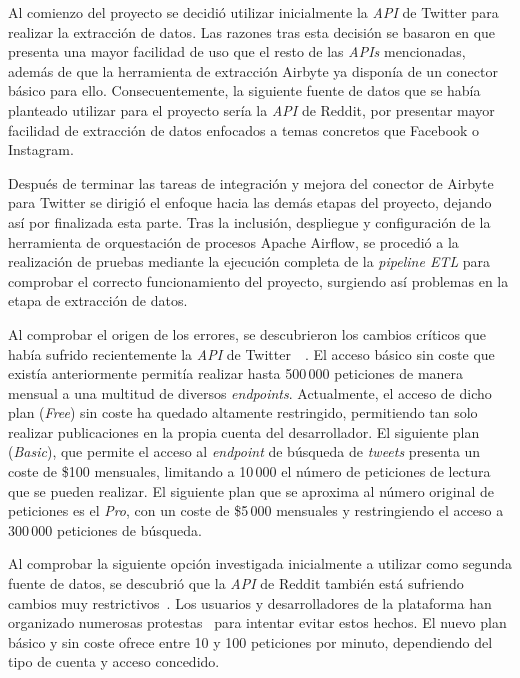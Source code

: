 Al comienzo del proyecto se decidió utilizar inicialmente la \textit{API} de Twitter para realizar la extracción de datos. Las razones tras esta decisión se basaron en que presenta una mayor facilidad de uso que el resto de las \textit{APIs} mencionadas, además de que la herramienta de extracción Airbyte ya disponía de un conector básico para ello. Consecuentemente, la siguiente fuente de datos que se había planteado utilizar para el proyecto sería la \textit{API} de Reddit, por presentar mayor facilidad de extracción de datos enfocados a temas concretos que Facebook o Instagram.

Después de terminar las tareas de integración y mejora del conector de Airbyte para Twitter se dirigió el enfoque hacia las demás etapas del proyecto, dejando así por finalizada esta parte. Tras la inclusión, despliegue y configuración de la herramienta de orquestación de procesos Apache Airflow, se procedió a la realización de pruebas mediante la ejecución completa de la \textit{pipeline ETL} para comprobar el correcto funcionamiento del proyecto, surgiendo así problemas en la etapa de extracción de datos.

Al comprobar el origen de los errores, se descubrieron los cambios críticos que había sufrido recientemente la \textit{API} de Twitter~\cite{karissa2023}~\cite{stokel2023}. El acceso básico sin coste que existía anteriormente permitía realizar hasta 500\,000 peticiones de manera mensual a una multitud de diversos \textit{endpoints}. Actualmente, el acceso de dicho plan (\textit{Free}) sin coste ha quedado altamente restringido, permitiendo tan solo realizar publicaciones en la propia cuenta del desarrollador. El siguiente plan (\textit{Basic}), que permite el acceso al \textit{endpoint} de búsqueda de \textit{tweets} presenta un coste de \$100 mensuales, limitando a 10\,000 el número de peticiones de lectura que se pueden realizar. El siguiente plan que se aproxima al número original de peticiones es el \textit{Pro}, con un coste de \$5\,000 mensuales y restringiendo el acceso a 300\,000 peticiones de búsqueda.

Al comprobar la siguiente opción investigada inicialmente a utilizar como segunda fuente de datos, se descubrió que la \textit{API} de Reddit también está sufriendo cambios muy restrictivos~\cite{watercutter2023}. Los usuarios y desarrolladores de la plataforma han organizado numerosas protestas~\cite{antonio2023} para intentar evitar estos hechos. El nuevo plan básico y sin coste ofrece entre 10 y 100 peticiones por minuto, dependiendo del tipo de cuenta y acceso concedido.

